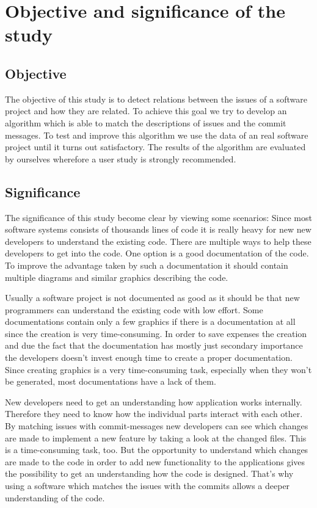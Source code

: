 \section{Objective and significance of the study}
\label{sec:objective}

\subsection{Objective}

The objective of this study is to detect relations between the issues of a software project and how they
are related. To achieve this goal we try to develop an algorithm which is able to match the descriptions
of issues and the commit messages. To test and improve this algorithm we use the data of an real software
project until it turns out satisfactory. The results of the algorithm are evaluated by ourselves wherefore
a user study is strongly recommended.

\subsection{Significance}
The significance of this study become clear by viewing some scenarios:
Since most software systems consists of thousands lines of code it is really heavy for new new developers
to understand the existing code. There are multiple ways to help these developers to get into the code.
One option is a good documentation of the code. To improve the advantage taken by such a documentation it
should contain multiple diagrams and similar graphics describing the code.

Usually a software project is not documented as good as it should be that new programmers can understand
the existing code with low effort. Some documentations contain only a few graphics if there is a
documentation at all since the creation is very time-consuming. In order to save expenses the creation and
due the fact that the documentation has mostly just secondary importance the developers doesn't invest
enough time to create a proper documentation. Since creating graphics is a very time-consuming task,
especially when they won't be generated, most documentations have a lack of them.

New developers need to get an understanding how application works internally. Therefore they need to know
how the individual parts interact with each other. 
By matching issues with commit-messages new developers can see which changes are made to implement a new
feature by taking a look at the changed files. This is a time-consuming task, too. But the opportunity to
understand which changes are made to the code in order to add new functionality to the applications gives
the possibility to get an understanding how the code is designed. That's why using a software which
matches the issues with the commits allows a deeper understanding of the code.


